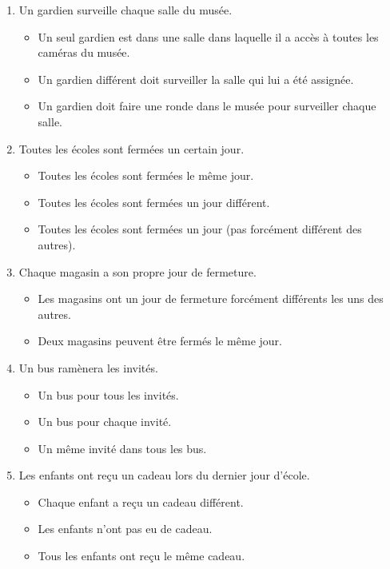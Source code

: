 \documentclass[11pt,letterpaper]{article}
\begin{document}
\begin{enumerate}
\item Un gardien surveille chaque salle du musée.
\begin{itemize}
    \item Un seul gardien est dans une salle dans laquelle il a accès à toutes les caméras du musée.
    \item Un gardien différent doit surveiller la salle qui lui a été assignée.
    \item Un gardien doit faire une ronde dans le musée pour surveiller chaque salle.
\end{itemize}

\vspace{7px}

\item Toutes les écoles sont fermées un certain jour.
\begin{itemize}
    \item Toutes les écoles sont fermées le même jour.
    \item Toutes les écoles sont fermées un jour différent.
    \item Toutes les écoles sont fermées un jour (pas forcément différent des autres).
\end{itemize}

\vspace{7px}

\item Chaque magasin a son propre jour de fermeture.
\begin{itemize}
    \item Les magasins ont un jour de fermeture forcément différents les uns des autres.
    \item Deux magasins peuvent être fermés le même jour.
\end{itemize}

\vspace{7px}

\item Un bus ramènera les invités.
\begin{itemize}
    \item Un bus pour tous les invités.
    \item Un bus pour chaque invité.
    \item Un même invité dans tous les bus.
\end{itemize}

\vspace{7px}

\item Les enfants ont reçu un cadeau lors du dernier jour d'école.
\begin{itemize}
    \item Chaque enfant a reçu un cadeau différent.
    \item Les enfants n'ont pas eu de cadeau.
    \item Tous les enfants ont reçu le même cadeau.
\end{itemize}


\end{enumerate}
\end{document}
